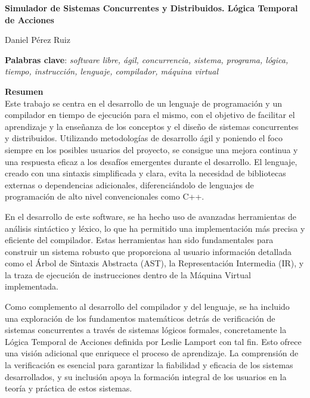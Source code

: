 \thispagestyle{empty}

\begin{center}
{\large\bfseries Simulador de Sistemas Concurrentes y Distribuidos. Lógica Temporal de Acciones }\\
\end{center}
\begin{center}
Daniel Pérez Ruiz\\
\end{center}


\vspace{0.5cm}
\noindent\textbf{Palabras clave}: \textit{software libre, ágil, concurrencia, sistema, programa, lógica, tiempo, instrucción, lenguaje, compilador, máquina virtual}
\vspace{0.7cm}

\noindent\textbf{Resumen}\\
Este trabajo se centra en el desarrollo de un lenguaje de programación y un compilador en tiempo de ejecución para el mismo, con el objetivo de facilitar el aprendizaje y la enseñanza de los conceptos y el diseño de sistemas concurrentes y distribuidos. Utilizando metodologías de desarrollo ágil y poniendo el foco siempre en los posibles usuarios del proyecto, se consigue una mejora continua y una respuesta eficaz a los desafíos emergentes durante el desarrollo. El lenguaje, creado con una sintaxis simplificada y clara, evita la necesidad de bibliotecas externas o dependencias adicionales, diferenciándolo de lenguajes de programación de alto nivel convencionales como C++.

En el desarrollo de este software, se ha hecho uso de avanzadas herramientas de análisis sintáctico y léxico, lo que ha permitido una implementación más precisa y eficiente del compilador. Estas herramientas han sido fundamentales para construir un sistema robusto que proporciona al usuario información detallada como el Árbol de Sintaxis Abstracta (AST), la Representación Intermedia (IR), y la traza de ejecución de instrucciones dentro de la Máquina Virtual implementada.

Como complemento al desarrollo del compilador y del lenguaje, se ha incluido una exploración de los fundamentos matemáticos detrás de verificación de sistemas concurrentes a través de sistemas lógicos formales, concretamente la Lógica Temporal de Acciones definida por Leslie Lamport con tal fin. Esto ofrece una visión adicional que enriquece el proceso de aprendizaje. La comprensión de la verificación es esencial para garantizar la fiabilidad y eficacia de los sistemas desarrollados, y su inclusión apoya la formación integral de los usuarios en la teoría y práctica de estos sistemas.

